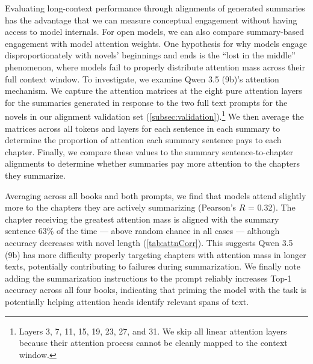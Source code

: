 \documentclass{article} %
\begin{document}
Evaluating long-context performance through alignments of generated summaries has the advantage that we can measure conceptual engagement without having access to model internals.
For open models, we can also compare summary-based engagement with model attention weights.
One hypothesis for why models engage disproportionately with novels' beginnings and ends is the ``lost in the middle'' phenomenon, where models fail to properly distribute attention mass across their full context window.
To investigate, we examine Qwen 3.5 (9b)'s attention mechanism.
We capture the attention matrices at the eight pure attention layers for the summaries generated in response to the two full text prompts for the novels in our alignment validation set (\cref{subsec:validation}).\footnote{Layers 3, 7, 11, 15, 19, 23, 27, and 31. We skip all linear attention layers because their attention process cannot be cleanly mapped to the context window.}
We then average the matrices across all tokens and layers for each sentence in each summary to determine the proportion of attention each summary sentence pays to each chapter.
Finally, we compare these values to the summary sentence-to-chapter alignments to determine whether summaries pay more attention to the chapters they summarize.

Averaging across all books and both prompts, we find that models attend slightly more to the chapters they are actively summarizing (Pearson's $R$ = 0.32).
The chapter receiving the greatest attention mass is aligned with the summary sentence 63\% of the time --- above random chance in all cases --- although accuracy decreases with novel length (\cref{tab:attnCorr}).
This suggests Qwen 3.5 (9b) has more difficulty properly targeting chapters with attention mass in longer texts, potentially contributing to failures during summarization.
We finally note adding the summarization instructions to the prompt reliably increases Top-1 accuracy across all four books, indicating that priming the model with the task is potentially helping attention heads identify relevant spans of text.
\end{document}
